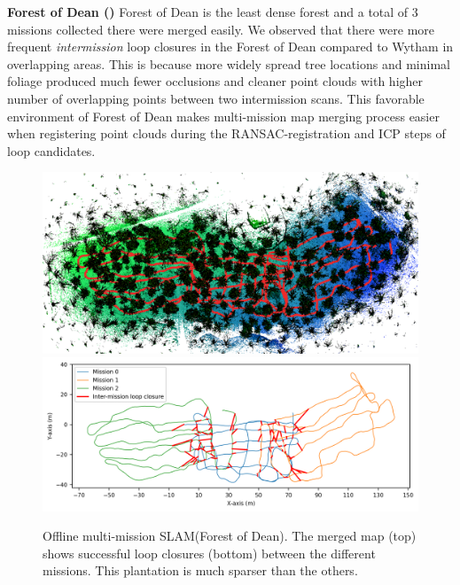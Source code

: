 \noindent \textbf{Forest of Dean ()}\hspace{0.5em} Forest of Dean is the least dense forest and a total of 3 missions collected there were merged easily. We observed that there were more frequent \emph{intermission} loop closures in the Forest of Dean compared to Wytham in overlapping areas. This is because more widely spread tree locations and minimal foliage produced much fewer occlusions and cleaner point clouds with higher number of overlapping points between two intermission scans. This favorable environment of Forest of Dean makes multi-mission map merging process easier when registering point clouds during the RANSAC-registration and ICP steps of loop candidates.
\begin{figure}[htbp]
  \centering
  \includegraphics[width=\columnwidth]{pics/exp_3_offline_Dean_pcd3.png}
  \includegraphics[width=\columnwidth]{pics/exp_3_1_multimission_slam_dean_ratio.png}
  \caption{Offline multi-mission SLAM(Forest of Dean). The merged map (top) shows successful loop closures (bottom) between the different missions. This plantation is much sparser than the others.}
  \label{fig:exp_multi_mission_dean}
\end{figure}
\vspace{5pt}

